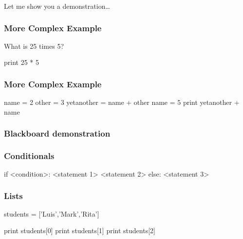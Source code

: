 \begin{frame}[fragile]

\bigskip
\bigskip
\bigskip
Let me show you a demonstration\ldots



\end{frame}

\begin{frame}[fragile]
\frametitle{More Complex Example}

What is 25 times 5?

\pause
\begin{python}
print 25 * 5
\end{python}
\end{frame}

\begin{frame}[fragile]
\frametitle{More Complex Example}

\begin{python}
name = 2
other = 3
yetanother = name + other
name = 5
print yetanother + name
\end{python}
\end{frame}

\begin{frame}[fragile]
\frametitle{Blackboard demonstration}

\end{frame}

\begin{frame}[fragile]
\frametitle{Conditionals}

\begin{python}

if <condition>:
    <statement 1>
    <statement 2>
else:
    <statement 3>

\end{python}
\end{frame}

\begin{frame}[fragile]
\frametitle{Lists}

\begin{python}

students = ['Luis','Mark','Rita']

print students[0]
print students[1]
print students[2]
\end{python}

\end{frame}

